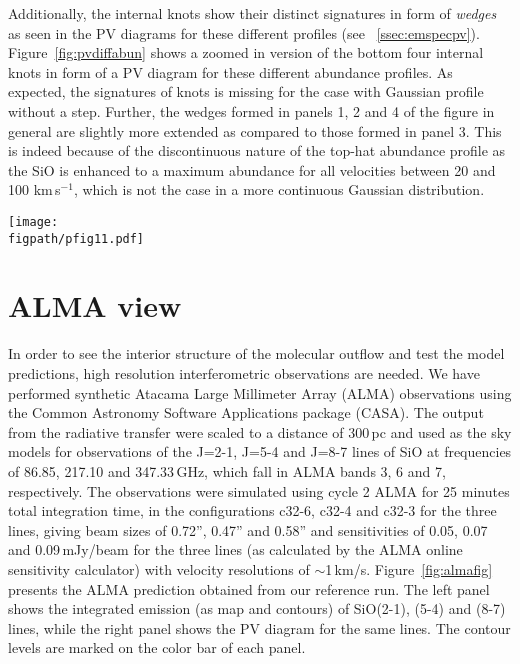 \documentclass[useAMS,usenatbib]{mn2e}
\newcommand{\figpath}{../NEWFIGS}
\begin{document}
Additionally, the internal knots show their distinct signatures in
form of {\em wedges} as seen in the PV diagrams for these
different profiles (see
~\ref{ssec:emspecpv}). Figure~\ref{fig:pvdiffabun} shows a zoomed in
version of the bottom four internal knots in form of a PV diagram for these
different abundance profiles. As expected, the signatures of knots 
is missing for the case with Gaussian profile without a step.
Further, the wedges formed in panels 1, 2 and 4 of the figure in
general are slightly more extended as compared to those
formed in panel 3. This is indeed because of the
discontinuous nature of the top-hat abundance profile as the SiO is
enhanced to a maximum abundance for all velocities between 20 and 100
km\,s$^{-1}$, which is not the case in a more continuous Gaussian
distribution.

\begin{figure*}
 \texttt{[image: \\figpath/pfig11.pdf]}%
 \caption{Position-velocity maps of SiO(2-1) for the internal
   knots produced in the model with reference parameters and different abundance
   profiles. The contours mark different levels of emission in K, viz.,
   0.1,0.2,0.6,1.0,1.4,1.8,2.0,3.0,4.0.}
\label{fig:pvdiffabun}
\end{figure*}
   
 
\section{ALMA view}
\label{sec:ALMAview}
%
In order to see the interior structure of the molecular outflow and
test the model predictions, high
resolution interferometric observations are needed. 
We have performed synthetic Atacama Large Millimeter
Array (ALMA) observations using the Common Astronomy Software
Applications package (CASA). The output from the radiative transfer
were scaled to a distance of 300\,pc and used as the sky models for observations of
the J=2-1, J=5-4 and J=8-7 lines of SiO at frequencies of 86.85, 217.10 and
347.33$\,$GHz, which fall in ALMA bands 3, 6 and 7, respectively. The observations
were simulated using cycle 2 ALMA for 25 minutes total integration
time, in the configurations c32-6, c32-4 and c32-3 for the three
lines, giving beam sizes of 0.72'', 0.47'' and 0.58'' and
sensitivities of 0.05, 0.07 and 0.09$\,$mJy/beam for the three lines
(as calculated by the ALMA online sensitivity calculator) with
velocity resolutions of $\sim$1$\,$km/s.
 Figure~\ref{fig:almafig}
presents the ALMA prediction obtained from our reference run. The
left panel shows the integrated emission (as map and contours) 
of SiO(2-1), (5-4) and (8-7) lines, while the right
panel shows the PV diagram for the same lines. The contour levels are marked
on the color bar of each panel. 
\end{document}
